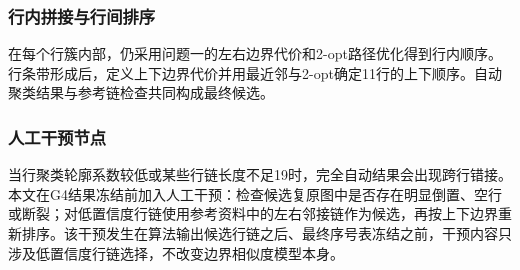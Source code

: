 \documentclass[UTF8,a4paper,12pt]{ctexart}
\begin{document}
\subsubsection{行内拼接与行间排序}
在每个行簇内部，仍采用问题一的左右边界代价和2-opt路径优化得到行内顺序。行条带形成后，定义上下边界代价并用最近邻与2-opt确定11行的上下顺序。自动聚类结果与参考链检查共同构成最终候选。

\subsubsection{人工干预节点}
当行聚类轮廓系数较低或某些行链长度不足19时，完全自动结果会出现跨行错接。本文在G4结果冻结前加入人工干预：检查候选复原图中是否存在明显倒置、空行或断裂；对低置信度行链使用参考资料中的左右邻接链作为候选，再按上下边界重新排序。该干预发生在算法输出候选行链之后、最终序号表冻结之前，干预内容只涉及低置信度行链选择，不改变边界相似度模型本身。
\end{document}
